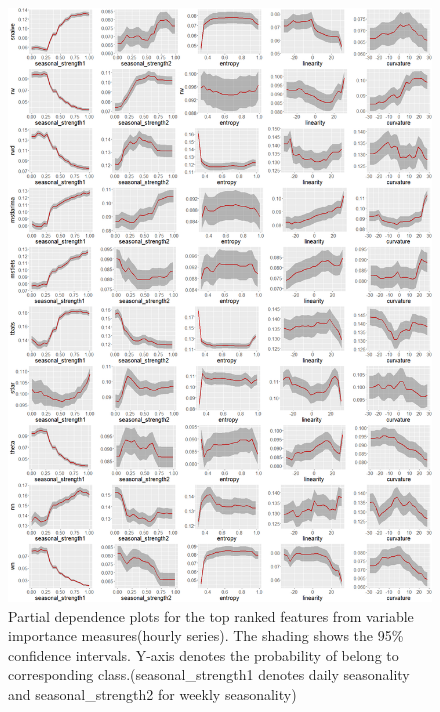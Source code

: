 \documentclass[11pt,a4paper,]{article}
\begin{document}
\begin{figure}
\centering
\includegraphics{figures/hourlypdp-1.png}
\caption{\label{fig:hourlypdp}Partial dependence plots for the top ranked
features from variable importance measures(hourly series). The shading
shows the 95\% confidence intervals. Y-axis denotes the probability of
belong to corresponding class.(seasonal\_strength1 denotes daily
seasonality and seasonal\_strength2 for weekly seasonality)}
\end{figure}

\newpage
\end{document}

